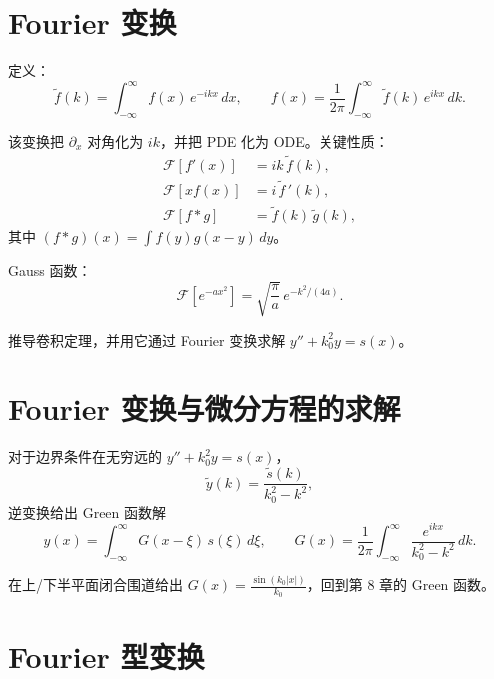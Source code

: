 \section{Fourier 变换}

定义：
\begin{equation}
\tilde f(k)=\int_{-\infty}^{\infty}f(x)\,e^{-ikx}\,dx,\qquad
f(x)=\frac{1}{2\pi}\int_{-\infty}^{\infty}\tilde f(k)\,e^{ikx}\,dk.
\label{eq:6.5.1}
\end{equation}

该变换把 $\partial_x$ 对角化为 $ik$，并把 PDE 化为 ODE。关键性质：
\begin{align}
\mathcal F[f'(x)] &= ik\,\tilde f(k),\\
\mathcal F[xf(x)] &= i\,\widetilde f\,'(k),\\
\mathcal F[f*g] &= \tilde f(k)\,\tilde g(k),
\label{eq:6.5.2}
\end{align}
其中 $(f*g)(x)=\int f(y)g(x-y)\,dy$。

Gauss 函数：
\begin{equation}
\mathcal F[e^{-ax^2}] = \sqrt{\frac{\pi}{a}}\,e^{-k^2/(4a)}.
\label{eq:6.5.3}
\end{equation}

\begin{exercise}
推导卷积定理，并用它通过 Fourier 变换求解
$y''+k_0^2y=s(x)$。
\end{exercise}

\section{Fourier 变换与微分方程的求解}

对于边界条件在无穷远的 $y''+k_0^2y=s(x)$，
\begin{equation}
\tilde y(k) = \frac{\tilde s(k)}{k_0^2-k^2},
\label{eq:6.6.1}
\end{equation}
逆变换给出 Green 函数解
\begin{equation}
y(x) = \int_{-\infty}^{\infty} G(x-\xi)\,s(\xi)\,d\xi,
\qquad G(x) = \frac{1}{2\pi}\int_{-\infty}^{\infty}
\frac{e^{ikx}}{k_0^2-k^2}\,dk.
\label{eq:6.6.2}
\end{equation}

在上/下半平面闭合围道给出
$G(x)=\frac{\sin(k_0|x|)}{k_0}$，回到第 8 章的 Green 函数。

\section{Fourier 型变换}

